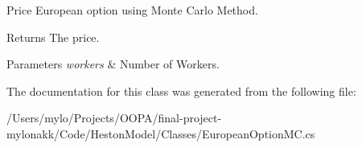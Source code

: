 Price European option using Monte Carlo Method. 

\begin{DoxyReturn}{Returns}
The price.
\end{DoxyReturn}

\begin{DoxyParams}{Parameters}
{\em workers} & Number of Workers.\\
\hline
\end{DoxyParams}


The documentation for this class was generated from the following file\+:\begin{DoxyCompactItemize}
\item 
/\+Users/mylo/\+Projects/\+O\+O\+P\+A/final-\/project-\/mylonakk/\+Code/\+Heston\+Model/\+Classes/European\+Option\+M\+C.\+cs\end{DoxyCompactItemize}
